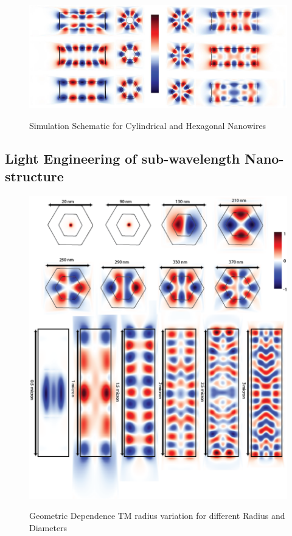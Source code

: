 \begin{figure}
  \caption{Simulation Schematic for Cylindrical and Hexagonal Nanowires}
  \centering
  \includegraphics[width=\textwidth]{pictures/LM/HexRP}
  \label{HexRP}
\end{figure}

\subsection{Light Engineering of sub-wavelength Nano-structure}

\begin{figure}
  \caption{Geometric Dependence TM radius variation for different Radius and Diameters}
  \centering
  \includegraphics[width=\textwidth]{pictures/LM/TMRadius}
  \label{TMRadius}
\end{figure}


